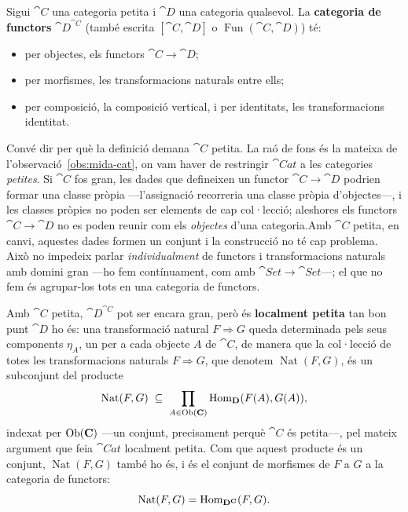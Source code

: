 \begin{definicio}
Sigui $\cat{C}$ una categoria petita i $\cat{D}$ una categoria qualsevol. La \textbf{categoria de functors} $\cat{D}^{\cat{C}}$ (també escrita $[\cat{C},\cat{D}]$ o $\operatorname{Fun}(\cat{C},\cat{D})$) té:
\begin{itemize}
\item per objectes, els functors $\cat{C}\to\cat{D}$;
\item per morfismes, les transformacions naturals entre ells;
\item per composició, la composició vertical, i per identitats, les transformacions identitat.
\end{itemize}
\end{definicio}

\begin{observacio}\label{obs:mida-functors}
Convé dir per què la definició demana $\cat{C}$ petita. La raó de fons és la mateixa de l'observació~\ref{obs:mida-cat}, on vam haver de restringir $\cat{Cat}$ a les categories \emph{petites}. Si $\cat{C}$ fos gran, les dades que defineixen un functor $\cat{C}\to\cat{D}$ podrien formar una classe pròpia ---l'assignació recorreria una classe pròpia d'objectes---, i les classes pròpies no poden ser elements de cap col·lecció; aleshores els functors $\cat{C}\to\cat{D}$ no es poden reunir com els \emph{objectes} d'una categoria.\footnotemark Amb $\cat{C}$ petita, en canvi, aquestes dades formen un conjunt i la construcció no té cap problema. Això no impedeix parlar \emph{individualment} de functors i transformacions naturals amb domini gran ---ho fem contínuament, com amb $\cat{Set}\to\cat{Set}$---; el que no fem és agrupar-los tots en una categoria de functors.

Amb $\cat{C}$ petita, $\cat{D}^{\cat{C}}$ pot ser encara gran, però és \textbf{localment petita} tan bon punt $\cat{D}$ ho és: una transformació natural $F\Rightarrow G$ queda determinada pels seus components $\eta_A$, un per a cada objecte $A$ de $\cat{C}$, de manera que la col·lecció de totes les transformacions naturals $F\Rightarrow G$, que denotem $\operatorname{Nat}(F,G)$, és un subconjunt del producte
\[
\operatorname{Nat}(F,G)\;\subseteq\;\prod_{A\in\operatorname{Ob}(\mathbf{C})}\operatorname{Hom}_{\mathbf{D}}(F(A),G(A)),
\]
indexat per $\operatorname{Ob}(\mathbf{C})$ ---un conjunt, precisament perquè $\cat{C}$ és petita---, pel mateix argument que feia $\cat{Cat}$ localment petita. Com que aquest producte és un conjunt, $\operatorname{Nat}(F,G)$ també ho és, i és el conjunt de morfismes de $F$ a $G$ a la categoria de functors:
\[
\operatorname{Nat}(F,G)=\operatorname{Hom}_{\mathbf{D}^{\mathbf{C}}}(F,G).
\]
\end{observacio}
%

